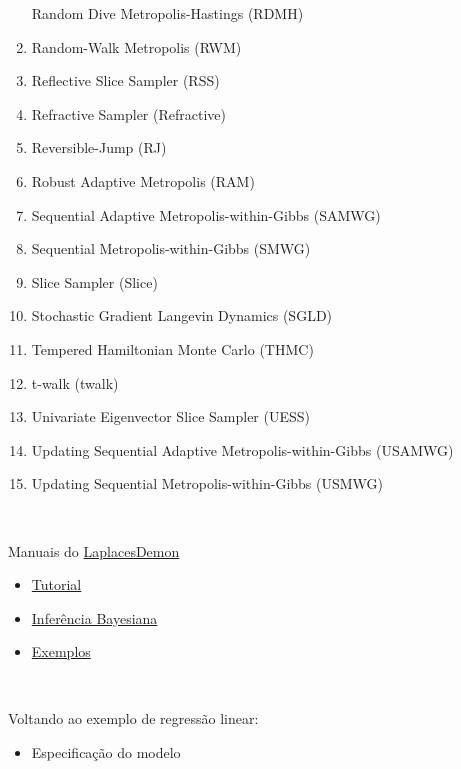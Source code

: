 \documentclass[
]{book}
\providecommand{\tightlist}{%
  \setlength{\itemsep}{0pt}\setlength{\parskip}{0pt}}
\begin{document}
\begin{enumerate}
  Random Dive Metropolis-Hastings (RDMH)
\item
  Random-Walk Metropolis (RWM)
\item
  Reflective Slice Sampler (RSS)
\item
  Refractive Sampler (Refractive)
\item
  Reversible-Jump (RJ)
\item
  Robust Adaptive Metropolis (RAM)
\item
  Sequential Adaptive Metropolis-within-Gibbs (SAMWG)
\item
  Sequential Metropolis-within-Gibbs (SMWG)
\item
  Slice Sampler (Slice)
\item
  Stochastic Gradient Langevin Dynamics (SGLD)
\item
  Tempered Hamiltonian Monte Carlo (THMC)
\item
  t-walk (twalk)
\item
  Univariate Eigenvector Slice Sampler (UESS)
\item
  Updating Sequential Adaptive Metropolis-within-Gibbs (USAMWG)
\item
  Updating Sequential Metropolis-within-Gibbs (USMWG)
\end{enumerate}

\(~\)

Manuais do \href{https://cran.r-project.org/web/packages/LaplacesDemon/LaplacesDemon.pdf}{LaplacesDemon}

\begin{itemize}
\item
  \href{https://cran.r-project.org/web/packages/LaplacesDemon/vignettes/LaplacesDemonTutorial.pdf}{Tutorial}
\item
  \href{https://cran.r-project.org/web/packages/LaplacesDemon/vignettes/BayesianInference.pdf}{Inferência Bayesiana}
\item
  \href{https://cran.r-project.org/web/packages/LaplacesDemon/vignettes/Examples.pdf}{Exemplos}
\end{itemize}

\(~\)

Voltando ao exemplo de regressão linear:

\begin{itemize}
\tightlist
\item
  Especificação do modelo
\end{itemize}
\end{document}
